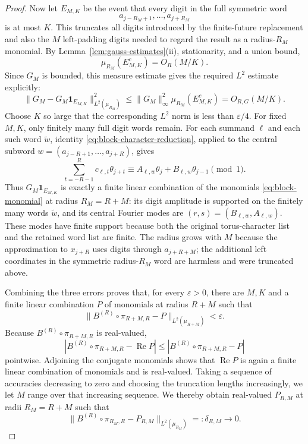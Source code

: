 \documentclass[11pt,a4paper]{amsart}
\theoremstyle{definition}
\theoremstyle{remark}
\newcommand{\ind}{\mathbf 1}
\begin{document}
\begin{proof}
Now let $E_{M,K}$ be the event that every digit in the full symmetric word
\[
 a_{j-R_M+1},\ldots,a_{j+R_M}
\]
is at most $K$.  This truncates all digits introduced by the finite-future
replacement and also the $M$ left-padding digits needed to regard the result
as a radius-$R_M$ monomial.  By Lemma~\ref{lem:gauss-estimates}(ii),
stationarity, and a union bound,
\[
 \mu_{R_M}(E_{M,K}^c)=O_R(M/K).
\]
Since $G_M$ is bounded, this measure estimate gives the required $L^2$
estimate explicitly:
\[
 \|G_M-G_M\ind_{E_{M,K}}\|_{L^2(\mu_{R_M})}^2
 \le \|G_M\|_\infty^2\mu_{R_M}(E_{M,K}^c)
 =O_{R,G}(M/K).
\]
Choose $K$ so large that the corresponding $L^2$ norm is less than
$\varepsilon/4$.  For fixed $M,K$, only finitely many full digit words remain.
For each summand $\ell$ and each such word $\widetilde w$, identity
\eqref{eq:block-character-reduction}, applied to the central subword
$w=(a_{j-R+1},\ldots,a_{j+R})$, gives
\[
 \sum_{t=-R-1}^{R}c_{\ell,t}\theta_{j+t}
 \equiv A_{\ell,w}\theta_j+B_{\ell,w}\theta_{j-1}\pmod1.
\]
Thus $G_M\ind_{E_{M,K}}$ is exactly a finite linear combination of the
monomials \eqref{eq:block-monomial} at radius $R_M=R+M$: its digit amplitude
is supported on the finitely many words $\widetilde w$, and its central
Fourier modes are $(r,s)=(B_{\ell,w},A_{\ell,w})$.  These modes have finite
support because both the original torus-character list and the retained word
list are finite.
The radius grows with $M$ because the approximation to $x_{j+R}$ uses digits
through $a_{j+R+M}$; the additional left coordinates in the symmetric
radius-$R_M$ word are harmless and were truncated above.

Combining the three errors proves that, for every $\varepsilon>0$, there are
$M,K$ and a finite linear combination $P$ of monomials at radius $R+M$ such
that
\[
 \|B^{(R)}\circ\pi_{R+M,R}-P\|_{L^2(\mu_{R+M})}<\varepsilon.
\]
Because $B^{(R)}\circ\pi_{R+M,R}$ is real-valued,
\[
 |B^{(R)}\circ\pi_{R+M,R}-\operatorname{Re}P|
 \le |B^{(R)}\circ\pi_{R+M,R}-P|
\]
pointwise.  Adjoining the conjugate monomials shows that
$\operatorname{Re}P$ is again a finite linear combination of monomials and is
real-valued.  Taking a sequence of accuracies decreasing
to zero and choosing the truncation lengths increasingly, we let $M$ range
over that increasing sequence.  We thereby obtain real-valued $P_{R,M}$ at
radii $R_M=R+M$ such that
\begin{equation}\label{eq:remainder-L2-approx}
 \|B^{(R)}\circ\pi_{R_M,R}-P_{R,M}\|_{L^2(\mu_{R_M})}
 =:\delta_{R,M}\longrightarrow0.
\end{equation}


\end{proof}
\end{document}
